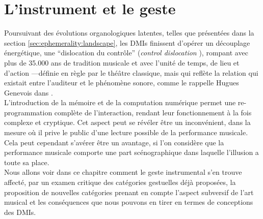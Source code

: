%
\chapter{L'instrument et le geste}
\label{ch:gesture}



\vspace*{\fill}

\noindent Poursuivant des évolutions organologiques latentes, telles que présentées dans la section \ref{sec:ephemerality:landscape}, les \glspl{DMI} finissent d'opérer un découplage énergétique, une ``dislocation du contrôle'' (\textit{control dislocation} \cite{miranda_new_2006}), rompant avec plus de 35.000 ans de tradition musicale \cite{conard_new_2009} et avec l'unité de temps, de lieu et d'action —définie en règle par le théâtre classique, mais qui reflète la relation qui existait entre l'auditeur et le phénomène sonore, comme le rappelle Hugues Genevois dans \cite{cance_what_2012}.\\
\indent L'introduction de la mémoire et de la computation numérique permet une re-programmation complète de l'interaction, rendant leur fonctionnement à la fois complexe et cryptique. Cet aspect peut se révéler être un inconvénient, dans la mesure où il prive le public d’une lecture possible de la performance musicale. Cela peut cependant s’avérer être un avantage, si l'on considère que la performance musicale comporte une part scénographique dans laquelle l’illusion a toute sa place. \\
\indent Nous allons voir dans ce chapitre comment le geste instrumental s'en trouve affecté, par un examen critique des catégories gestuelles déjà proposées, la proposition de nouvelles catégories prenant en compte l'aspect subversif de l'art musical et les conséquences que nous pouvons en tirer en termes de conceptions des \glspl{DMI}.

